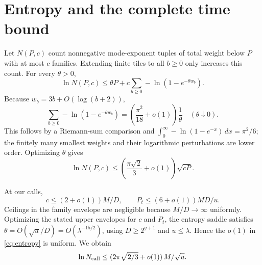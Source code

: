 \documentclass[11pt,letterpaper]{article}
\numberwithin{equation}{section}
\theoremstyle{definition}\newtheorem{definition}[theorem]{Definition}
\theoremstyle{remark}\newtheorem{remark}[theorem]{Remark}
\begin{document}
\section{Entropy and the complete time bound}
\label{sec:complexity}

Let $N(P,c)$ count nonnegative mode-exponent tuples of total weight below
$P$ with at most $c$ families. Extending finite tiles to all $b\ge0$
only increases this count. For every $\theta>0$,
\[
 \ln N(P,c)
 \le\theta P+c\sum_{b\ge0}-\ln(1-e^{-\theta w_b}).
\]
Because $w_b=3b+O(\log(b+2))$,
\[
 \sum_{b\ge0}-\ln(1-e^{-\theta w_b})
 =\left(\frac{\pi^2}{18}+o(1)\right)\frac1\theta
 \quad(\theta\downarrow0).
\]
This follows by a Riemann-sum comparison and
$\int_0^\infty-\ln(1-e^{-x})\,dx=\pi^2/6$; the finitely many smallest
weights and their logarithmic perturbations are lower order.
Optimizing $\theta$ gives
\begin{equation}
 \ln N(P,c)\le
 \left(\frac{\pi\sqrt2}{3}+o(1)\right)\sqrt{cP}.
 \label{eq:entropy}
\end{equation}

At our calls,
\[
 c\le(2+o(1))M/D,\qquad P_t\le(6+o(1))MD/u.
\]
Ceilings in the family envelope are negligible because $M/D\to\infty$
uniformly. Optimizing the stated upper envelopes for $c$ and $P_t$, the entropy
saddle satisfies $\theta=O(\sqrt u/D)=O(\lambda^{-15/2})$, using $D\ge2^{g+1}$
and $u\le\lambda$. Hence the $o(1)$ in \eqref{eq:entropy} is uniform.
We obtain
\begin{equation}
 \ln N_{\rm call}\le
 (2\pi\sqrt{2/3}+o(1))\,M/\sqrt u.
 \label{eq:local-entropy}
\end{equation}
\end{document}
